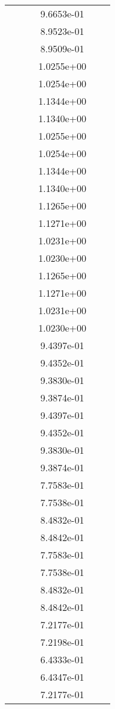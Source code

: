\begin{xltabular}{\textwidth}{r|rS[table-format=1.3e+2]S[table-format=1.4e+2]S[table-format=1.4e+2]S[table-format=-1.5]}
&  &  & 9.6653e-01 & & \\
&  &  & 8.9523e-01 & & \\
&  &  & 8.9509e-01 & & \\
&  &  & 1.0255e+00 & & \\
&  &  & 1.0254e+00 & & \\
&  &  & 1.1344e+00 & & \\
&  &  & 1.1340e+00 & & \\
&  &  & 1.0255e+00 & & \\
&  &  & 1.0254e+00 & & \\
&  &  & 1.1344e+00 & & \\
&  &  & 1.1340e+00 & & \\
&  &  & 1.1265e+00 & & \\
&  &  & 1.1271e+00 & & \\
&  &  & 1.0231e+00 & & \\
&  &  & 1.0230e+00 & & \\
&  &  & 1.1265e+00 & & \\
&  &  & 1.1271e+00 & & \\
&  &  & 1.0231e+00 & & \\
&  &  & 1.0230e+00 & & \\
&  &  & 9.4397e-01 & & \\
&  &  & 9.4352e-01 & & \\
&  &  & 9.3830e-01 & & \\
&  &  & 9.3874e-01 & & \\
&  &  & 9.4397e-01 & & \\
&  &  & 9.4352e-01 & & \\
&  &  & 9.3830e-01 & & \\
&  &  & 9.3874e-01 & & \\
&  &  & 7.7583e-01 & & \\
&  &  & 7.7538e-01 & & \\
&  &  & 8.4832e-01 & & \\
&  &  & 8.4842e-01 & & \\
&  &  & 7.7583e-01 & & \\
&  &  & 7.7538e-01 & & \\
&  &  & 8.4832e-01 & & \\
&  &  & 8.4842e-01 & & \\
&  &  & 7.2177e-01 & & \\
&  &  & 7.2198e-01 & & \\
&  &  & 6.4333e-01 & & \\
&  &  & 6.4347e-01 & & \\
&  &  & 7.2177e-01 & & \\

\end{xltabular}
